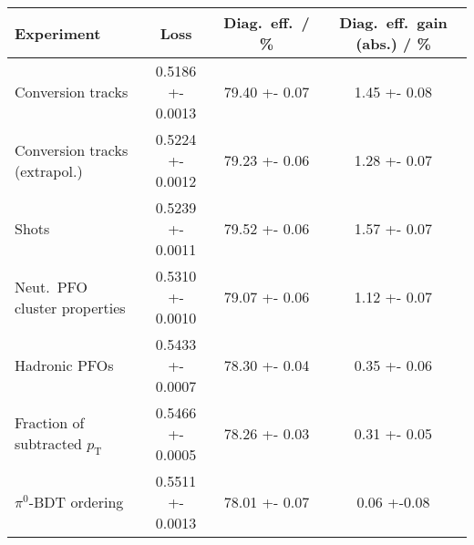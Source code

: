 \begin{tabular}{p{5cm}S[table-format=1.4(4)]S[table-format=2.2(2)]S[table-format=1.2(2)]}
  \toprule
  {Experiment} & {Loss} & {Diag.\ eff.\ / \si{\percent}} & {Diag.\ eff.\ gain (abs.) / \si{\percent}} \\
  \midrule
  Conversion tracks & 0.5186 +- 0.0013 & 79.40 +- 0.07 & 1.45 +- 0.08 \\
  Conversion tracks (extrapol.) & 0.5224 +- 0.0012 & 79.23 +- 0.06 & 1.28 +- 0.07 \\
  Shots & 0.5239 +- 0.0011 & 79.52 +- 0.06 &  1.57 +- 0.07 \\
  Neut.\ PFO cluster properties & 0.5310 +- 0.0010 & 79.07 +- 0.06 & 1.12 +- 0.07 \\
  Hadronic PFOs & 0.5433 +- 0.0007 & 78.30 +- 0.04 & 0.35 +- 0.06 \\
  Fraction of subtracted $p_\text{T}$ & 0.5466 +- 0.0005 & 78.26 +- 0.03 & 0.31 +- 0.05 \\
  $\pi^0$-BDT ordering & 0.5511 +- 0.0013 & 78.01 +- 0.07 & 0.06 +-0.08 \\
  \bottomrule
\end{tabular}

